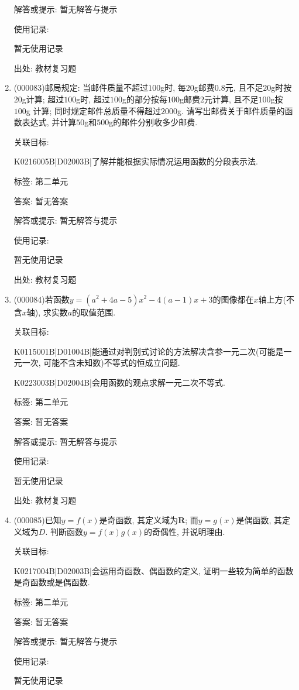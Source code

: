 \documentclass[10pt,a4paper]{article}
\begin{document}
\begin{enumerate}[1.]
解答或提示: 暂无解答与提示

使用记录:

暂无使用记录


出处: 教材复习题
\item { (000083)}邮局规定: 当邮件质量不超过$100$g时, 每$20$g邮费$0.8$元, 且不足$20$g时按$20$g计算; 超过$100$g时, 超过$100$g的部分按每$100$g邮费$2$元计算, 且不足$100$g按$100$g
计算; 同时规定邮件总质量不得超过$2000$g. 请写出邮费关于邮件质量的函数表达式, 并计算$50$g和$500$g的邮件分别收多少邮费.


关联目标:

K0216005B|D02003B|了解并能根据实际情况运用函数的分段表示法.



标签: 第二单元

答案: 暂无答案

解答或提示: 暂无解答与提示

使用记录:

暂无使用记录


出处: 教材复习题
\item { (000084)}若函数$y=(a^2+4a-5)x^2-4(a-1)x+3$的图像都在$x$轴上方(不含$x$轴), 求实数$a$的取值范围.


关联目标:

K0115001B|D01004B|能通过对判别式讨论的方法解决含参一元二次(可能是一元一次, 可能不含未知数)不等式的恒成立问题.

K0223003B|D02004B|会用函数的观点求解一元二次不等式.



标签: 第二单元

答案: 暂无答案

解答或提示: 暂无解答与提示

使用记录:

暂无使用记录


出处: 教材复习题
\item { (000085)}已知$y=f(x)$是奇函数, 其定义域为$\mathbf{R}$; 而$y=g(x)$是偶函数, 其定义域为$D$. 判断函数$y=f(x)g(x)$的奇偶性, 并说明理由.


关联目标:

K0217004B|D02003B|会运用奇函数、偶函数的定义, 证明一些较为简单的函数是奇函数或是偶函数.



标签: 第二单元

答案: 暂无答案

解答或提示: 暂无解答与提示

使用记录:

暂无使用记录



\end{enumerate}
\end{document}
